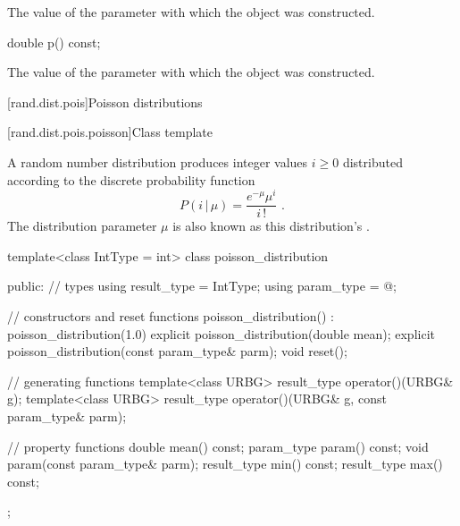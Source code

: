 \begin{itemdescr}
\pnum\returns The value of the  parameter
 with which the object was constructed.
\end{itemdescr}

%
\begin{itemdecl}
double p() const;
\end{itemdecl}

\begin{itemdescr}
\pnum\returns The value of the  parameter
 with which the object was constructed.
\end{itemdescr}%
%
%



[rand.dist.pois]{Poisson distributions}%
%
%


[rand.dist.pois.poisson]{Class template }%
%
%

\pnum
A  random number distribution
produces integer values $i \geq 0$
distributed according to
the discrete probability function
%
%
\[ P(i\,|\,\mu) = \frac{e^{-\mu} \mu^{i}}{i\,!} \text{ .} \]
The distribution parameter $\mu$
is also known as this distribution's %
%
%
.

%
\begin{codeblock}
template<class IntType = int>
  class poisson_distribution
  {
  public:
    // types
    using result_type = IntType;
    using param_type  = @\unspec@;

    // constructors and reset functions
    poisson_distribution() : poisson_distribution(1.0) {}
    explicit poisson_distribution(double mean);
    explicit poisson_distribution(const param_type& parm);
    void reset();

    // generating functions
    template<class URBG>
      result_type operator()(URBG& g);
    template<class URBG>
      result_type operator()(URBG& g, const param_type& parm);

    // property functions
    double mean() const;
    param_type param() const;
    void param(const param_type& parm);
    result_type min() const;
    result_type max() const;
  };
\end{codeblock}

